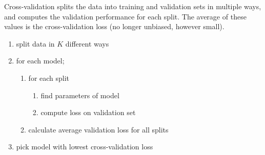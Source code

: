 \documentclass[a4paper, 12pt]{article}
\begin{document}
            Cross-validation splits the data into training and validation sets in multiple ways, and computes the validation performance for each split.
            The average of these values is the cross-validation loss (no longer unbiased, however small).
            \begin{enumerate}
                \itemsep0em
                \item split data in $K$ different ways
                \item for each model;
                    \begin{enumerate}
                        \itemsep0em
                        \item for each split
                            \begin{enumerate}
                                \itemsep0em
                                \item find parameters of model
                                \item compute loss on validation set
                            \end{enumerate}
                        \item calculate average validation loss for all splits
                    \end{enumerate}
                \item pick model with lowest cross-validation loss
            \end{enumerate}
\end{document}
